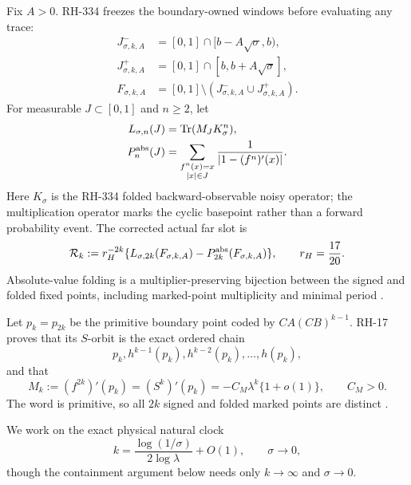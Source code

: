 \documentclass[11pt]{article}
\theoremstyle{remark}
\newcommand{\Tr}{\operatorname{Tr}}
\newcommand{\cR}{\mathcal R}
\begin{document}
Fix $A>0$.  RH-334 freezes the boundary-owned windows before evaluating any
trace:
\begin{align}
 J^-_{\sigma,k,A}&=[0,1]\cap[b-A\sqrt\sigma,b),\label{eq:Jminus}\\
 J^+_{\sigma,k,A}&=[0,1]\cap[b,b+A\sqrt\sigma],\label{eq:Jplus}\\
 F_{\sigma,k,A}&=[0,1]\setminus(J^-_{\sigma,k,A}\cup J^+_{\sigma,k,A}).
 \label{eq:F}
\end{align}
For measurable $J\subset[0,1]$ and $n\ge2$, let
\begin{align}
 L_{\sigma,n}(J)&=\Tr(M_JK_\sigma^n),\label{eq:L}\\
 P_n^{\rm abs}(J)&=
 \sum_{\substack{f^n(x)=x\\ |x|\in J}}
 \frac1{|1-(f^n)'(x)|}.
 \label{eq:Pabs}
\end{align}
Here $K_\sigma$ is the RH-334 folded backward-observable noisy operator; the
multiplication operator marks the cyclic basepoint rather than a forward
probability event.
The corrected actual far slot is
\begin{equation}\label{eq:R-full}
 \cR_k:=r_H^{-2k}
 \{L_{\sigma,2k}(F_{\sigma,k,A})
       -P_{2k}^{\rm abs}(F_{\sigma,k,A})\},
 \qquad r_H=\frac{17}{20}.
\end{equation}
Absolute-value folding is a multiplier-preserving bijection between the
signed and folded fixed points, including marked-point multiplicity and
minimal period \citep{WangObservation2026}.

Let $p_k=p_{2k}$ be the primitive boundary point coded by
$CA(CB)^{k-1}$.  RH-17 proves that its $S$-orbit is the exact ordered chain
\begin{equation}\label{eq:S-chain}
 p_k, h^{k-1}(p_k), h^{k-2}(p_k),\ldots,h(p_k),
\end{equation}
and that
\begin{equation}\label{eq:multiplier-law}
 M_k:=(f^{2k})'(p_k)=(S^k)'(p_k)
 =-C_M\lambda^k\{1+o(1)\},
 \qquad C_M>0.
\end{equation}
The word is primitive, so all $2k$ signed and folded marked points are
distinct \citep{WangLongCycle2026,WangBoundaryMonodromy2026}.

We work on the exact physical natural clock
\begin{equation}\label{eq:natural-clock}
 k=\frac{\log(1/\sigma)}{2\log\lambda}+O(1),
 \qquad \sigma\to0,
\end{equation}
though the containment argument below needs only $k\to\infty$ and
$\sigma\to0$.
\end{document}
